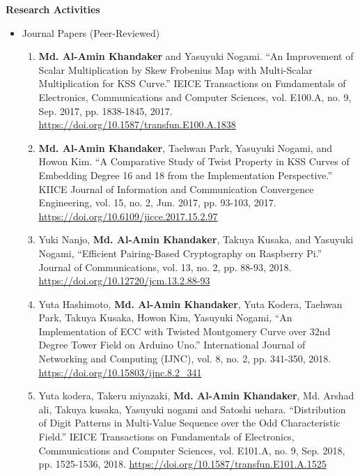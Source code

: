 
\newpage
\pagestyle{plain}
\textbf{\huge Research Activities}\label{research_activity}
\vspace{10mm}\\
\begin{itemize}
\large
\item Journal Papers (Peer-Reviewed)
\normalsize
\begin{enumerate}
	
	\item \textbf{Md. Al-Amin Khandaker} and Yasuyuki Nogami. ``An Improvement of Scalar Multiplication by Skew Frobenius Map with Multi-Scalar Multiplication for KSS Curve.'' IEICE Transactions on Fundamentals of Electronics, Communications and Computer Sciences, vol. E100.A, no. 9, Sep. 2017, pp. 1838-1845, 2017. \url{https://doi.org/10.1587/transfun.E100.A.1838}
	
	\item \textbf{Md. Al-Amin Khandaker}, Taehwan Park, Yasuyuki Nogami, and Howon Kim. ``A Comparative Study of Twist Property in KSS Curves of Embedding Degree 16 and 18 from the Implementation Perspective.'' KIICE Journal of Information and Communication Convergence Engineering, vol. 15, no. 2, Jun. 2017, pp. 93-103, 2017. \url{https://doi.org/10.6109/jicce.2017.15.2.97}
	
	\item Yuki Nanjo,  \textbf{Md. Al-Amin Khandaker}, Takuya Kusaka, and Yasuyuki Nogami, ``Efficient Pairing-Based Cryptography on Raspberry Pi.'' Journal of Communications, vol. 13, no. 2, pp. 88-93, 2018.  \url{https://doi.org/10.12720/jcm.13.2.88-93} 
		
	\item Yuta Hashimoto,  \textbf{Md. Al-Amin Khandaker}, Yuta Kodera, Taehwan Park, Takuya Kusaka, Howon Kim, Yasuyuki Nogami, ``An Implementation of ECC with Twisted Montgomery Curve over 32nd Degree Tower Field on Arduino Uno.'' International Journal of Networking and Computing (IJNC), vol. 8, no. 2, pp. 341-350, 2018.
	\url{https://doi.org/10.15803/ijnc.8.2_341}
	
	\item Yuta kodera, Takeru miyazaki, \textbf{Md. Al-Amin Khandaker},  Md. Arshad ali, Takuya kusaka, Yasuyuki nogami and Satoshi uehara. ``Distribution of Digit Patterns in Multi-Value Sequence over the Odd Characteristic Field.'' IEICE Transactions on Fundamentals of Electronics, Communications and Computer Sciences, vol. E101.A, no. 9, Sep. 2018, pp. 1525-1536, 2018. \url{https://doi.org/10.1587/transfun.E101.A.1525}
	

\end{enumerate}
\end{itemize}
